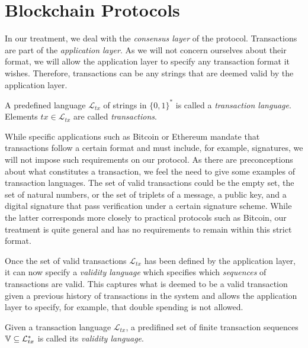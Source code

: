 \section{Blockchain Protocols}

In our treatment, we deal with the \emph{consensus layer}
of the protocol. Transactions are part of the
\emph{application layer}. As we will not concern
ourselves about their format, we will allow the application layer to specify any
transaction format it wishes. Therefore, transactions can be any strings that
are deemed valid by the application layer.

\begin{definition}[Transaction]
  A predefined language $\mathcal{L}_{tx}$ of strings in $\{0, 1\}^*$ is called
  a \emph{transaction language}. Elements $tx \in \mathcal{L}_{tx}$ are called
  \emph{transactions}.
\end{definition}

While specific applications such as Bitcoin or Ethereum mandate that
transactions follow a certain format and must include, for example, signatures,
we will not impose such requirements on our protocol. As there are
preconceptions about what constitutes a transaction, we feel the need to give
some examples of transaction languages. The set of valid transactions could be
the empty set, the set of natural numbers, or the set of triplets of a message,
a public key, and a digital signature that pass verification under a certain
signature scheme. While the latter corresponds more closely to practical
protocols such as Bitcoin, our treatment is quite general and has no
requirements to remain within this strict format.

Once the set of valid transactions $\mathcal{L}_{tx}$ has been defined by the
application layer, it can now specify a \emph{validity language} which specifies
which \emph{sequences} of transactions are valid. This captures what is deemed
to be a valid transaction given a previous history of transactions in the
system and allows the application layer to specify, for example, that double
spending is not allowed.

\begin{definition}
  Given a transaction language $\mathcal{L}_{tx}$, a predifined set of finite
  transaction sequences $\mathbb{V} \subseteq \mathcal{L}_{tx}^*$ is called its
  \emph{validity language}.
\end{definition}

